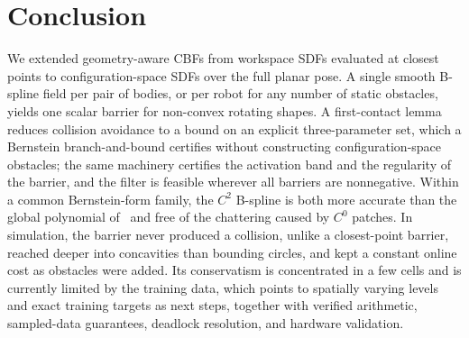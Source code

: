 \documentclass[journal]{IEEEtran}
\theoremstyle{definition}
\begin{document}
\section{Conclusion}\label{sec:concl}
We extended geometry-aware CBFs from workspace SDFs evaluated at closest points to
configuration-space SDFs over the full planar pose. A single smooth B-spline field per pair of
bodies, or per robot for any number of static obstacles, yields one scalar barrier for non-convex
rotating shapes. A first-contact lemma reduces collision avoidance to a bound on an explicit
three-parameter set, which a Bernstein branch-and-bound certifies without constructing
configuration-space obstacles; the same machinery certifies the activation band and the regularity
of the barrier, and the filter is feasible wherever all barriers are nonnegative. Within a common
Bernstein-form family, the $C^2$ B-spline is both more accurate than the global polynomial
of~\cite{jo2026geometry} and free of the chattering caused by $C^0$ patches. In simulation, the
barrier never produced a collision, unlike a closest-point barrier, reached deeper into concavities
than bounding circles, and kept a constant online cost as obstacles were added. Its conservatism is
concentrated in a few cells and is currently limited by the training data, which points to
spatially varying levels and exact training targets as next steps, together with verified
arithmetic, sampled-data guarantees, deadlock resolution, and hardware validation.



\end{document}
